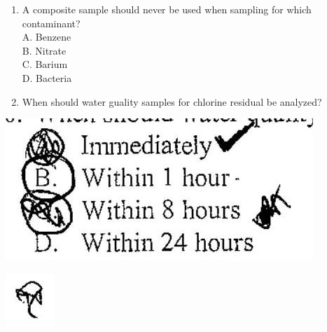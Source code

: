 \documentclass[10pt]{article}
\begin{document}
\begin{enumerate}
  \item A composite sample should never be used when sampling for which contaminant?\\
A. Benzene\\
B. Nitrate\\
C. Barium\\
D. Bacteria

  \item When should water guality samples for chlorine residual be analyzed?

\end{enumerate}

\includegraphics[max width=\textwidth]{2022_11_11_6852287475e47d0e3aceg-06}

\includegraphics[max width=\textwidth]{2022_11_11_6852287475e47d0e3aceg-06(1)}
\end{document}
